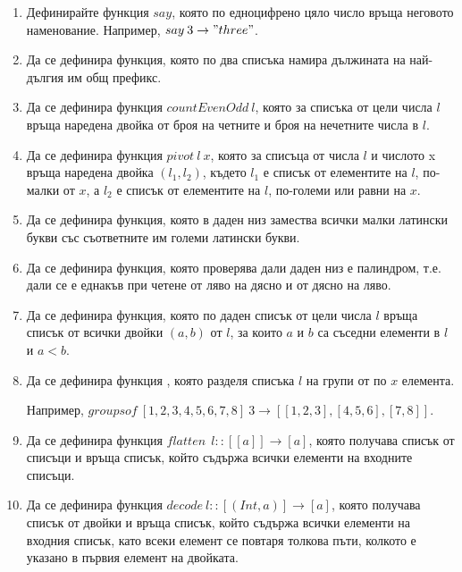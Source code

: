 \begin{enumerate}[]

	\item Дефинирайте функция $say$, която по едноцифрено цяло число връща неговото наменование. Например, $say \: 3 \rightarrow "three"$.

	\item Да се дефинира функция, която по два списъка намира дължината на най-дългия им общ префикс.

	\item Да се дефинира функция $countEvenOdd \: l$, която за списъка от цели числа $l$ връща наредена двойка от броя на четните и броя на нечетните числа в $l$.

	\item Да се дефинира функция $pivot \: l \: x$, която за списъца от числа $l$ и числото x връща наредена двойка $(l_1,l_2)$, където $l_1$ е списък от елементите на $l$, по-малки от $x$, а $l_2$ е списък от елементите на $l$, по-големи или равни на $x$.
	
	\item Да се дефинира функция, която в даден низ замества всички малки латински букви със съответните им големи латински букви.
	
	\item Да се дефинира функция, която проверява дали даден низ е палиндром, т.е. дали се е еднакъв при четене от ляво на дясно и от дясно на ляво.
	
	\item Да се дефинира функция, която по даден списък от цели числа $l$ връща списък от всички двойки $(a,b)$ от $l$, за които $a$ и $b$ са съседни елементи в $l$ и $a < b$.
	
	\item Да се дефинира функция , която разделя списъка $l$ на групи от по $x$ елемента. 
	
	Например, $groupsof \: [1,2,3,4,5,6,7,8] \: 3 \rightarrow [[1,2,3],[4,5,6],[7,8]]$.

	\item Да се дефинира функция $flatten \: \: l :: [[a]] \rightarrow [a]$, която получава списък от списъци и връща списък, който съдържа всички елементи на входните списъци.

	\item Да се дефинира функция $decode \: l :: [(Int,a)] \rightarrow [a]$, която получава списък от двойки и връща списък, който съдържа всички елементи на входния списък, като всеки елемент се повтаря толкова пъти, колкото е указано в първия елемент на двойката.


\end{enumerate}
